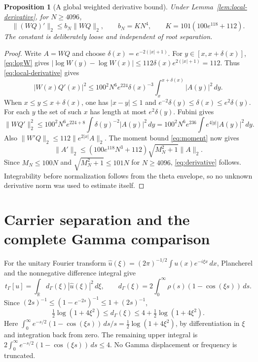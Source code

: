 \documentclass[11pt]{article}
\newtheorem{proposition}[theorem]{Proposition}
\theoremstyle{remark}
\newcommand{\R}{\mathbb R}
\newcommand{\norm}[1]{\lVert #1\rVert}
\newcommand{\tg}{t_\Gamma}
\begin{document}
\begin{proposition}[A global weighted derivative bound]\label{prop:derivative}
Under Lemma~\ref{lem:local-derivative}, for $N\ge4096$,
\begin{equation}\label{eq:derivative}
 \norm{(WQ)'}_2\le b_N\norm{WQ}_2,\qquad
 b_N=KN^4,\qquad K=101(100e^{118}+112).
\end{equation}
The constant is deliberately loose and independent of root separation.
\end{proposition}
\begin{proof}
Write $A=WQ$ and choose $\delta(x)=e^{-2(|x|+1)}$.
For $y\in[x,x+\delta(x)]$, \eqref{eq:logW} gives
$|\log W(y)-\log W(x)|\le112\delta(x)e^{2(|x|+1)}=112$.
Thus \eqref{eq:local-derivative} gives
\[
 |W(x)Q'(x)|^2
   \le100^2N^6e^{224}\delta(x)^{-3}
                         \int_x^{x+\delta(x)}|A(y)|^2\,dy.
\]
When $x\le y\le x+\delta(x)$, one has $|x-y|\le1$ and
$e^{-2}\delta(y)\le\delta(x)\le e^2\delta(y)$.
For each $y$ the set of such $x$ has length at most $e^2\delta(y)$.
Fubini gives
\[
 \norm{WQ'}_2^2
   \le100^2N^6e^{224+8}\int\delta(y)^{-2}|A(y)|^2\,dy
    =100^2N^6e^{236}\int e^{4|y|}|A(y)|^2\,dy.
\]
Also $\norm{W'Q}_2\le112\norm{e^{2|x|}A}_2$.
The moment bound \eqref{eq:moment} now gives
\[
 \norm{A'}_2
 \le(100e^{118}N^3+112)\sqrt{M_N^2+1}\norm A_2.
\]
Since $M_N\le100N$ and $\sqrt{M_N^2+1}\le101N$ for $N\ge4096$,
\eqref{eq:derivative} follows. Integrability before normalization
follows from the theta envelope, so no unknown derivative norm was
used to estimate itself.
\end{proof}

\section{Carrier separation and the complete Gamma comparison}
For the unitary Fourier transform
$\widehat u(\xi)=(2\pi)^{-1/2}\int u(x)e^{-i\xi x}\,dx$,
Plancherel and the nonnegative difference integral give
\begin{equation}\label{eq:gamma-symbol}
 \tg[u]=\int_\R d_\Gamma(\xi)|\widehat u(\xi)|^2\,d\xi,\qquad
 d_\Gamma(\xi)=2\int_0^\infty\rho(s)(1-\cos(\xi s))\,ds.
\end{equation}
Since $(2s)^{-1}\le(1-e^{-2s})^{-1}\le1+(2s)^{-1}$,
\begin{equation}\label{eq:gamma-bounds}
 \tfrac12\log(1+4\xi^2)\le d_\Gamma(\xi)
                           \le4+\tfrac12\log(1+4\xi^2).
\end{equation}
Here
$\int_0^\infty e^{-s/2}(1-\cos(\xi s))\,ds/s
=\tfrac12\log(1+4\xi^2)$, by differentiation in $\xi$ and integration
back from zero. The remaining upper integral is
$2\int_0^\infty e^{-s/2}(1-\cos(\xi s))\,ds\le4$.
No Gamma displacement or frequency is truncated.
\end{document}
